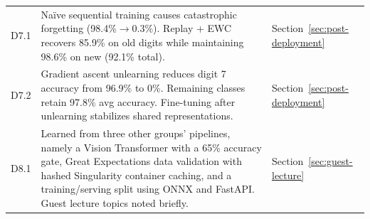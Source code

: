\begin{table}[t]
\begin{tabularx}{\textwidth}{@{} l X l @{}}
        D7.1  & Na\"ive sequential training causes catastrophic forgetting (98.4\%$\to$0.3\%). Replay + EWC recovers 85.9\% on old digits while maintaining 98.6\% on new (92.1\% total). & Section~\ref{sec:post-deployment} \\
        D7.2  & Gradient ascent unlearning reduces digit 7 accuracy from 96.9\% to 0\%. Remaining classes retain 97.8\% avg accuracy. Fine-tuning after unlearning stabilizes shared representations. & Section~\ref{sec:post-deployment} \\
        D8.1  & Learned from three other groups' pipelines, namely a Vision Transformer with a 65\% accuracy gate, Great Expectations data validation with hashed Singularity container caching, and a training/serving split using ONNX and FastAPI. Guest lecture topics noted briefly. & Section~\ref{sec:guest-lecture} \\
        \bottomrule
    \end{tabularx}
\end{table}

